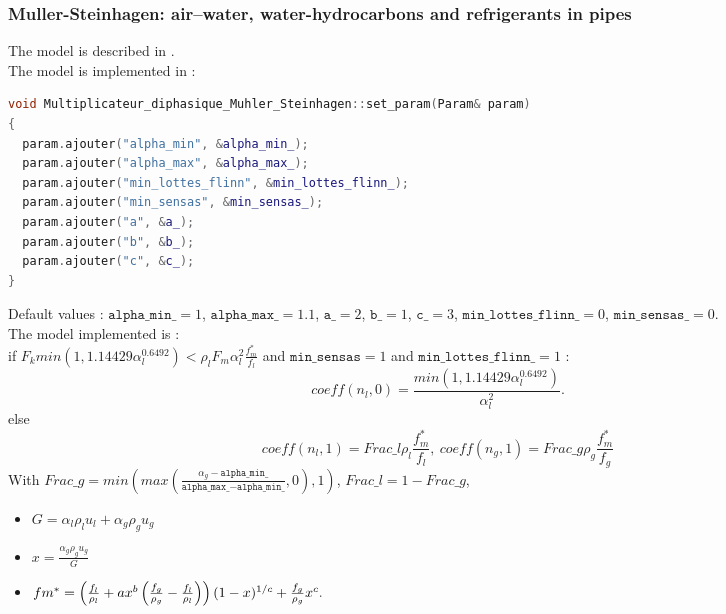 \subsubsection{Muller-Steinhagen: air–water, water-hydrocarbons and refrigerants in pipes}
The model is described in \cite{MULLERSTEINHAGEN1986297}.\\
The model is implemented in :
\begin{lstlisting}[language=c++]
void Multiplicateur_diphasique_Muhler_Steinhagen::set_param(Param& param)
{
  param.ajouter("alpha_min", &alpha_min_);
  param.ajouter("alpha_max", &alpha_max_);
  param.ajouter("min_lottes_flinn", &min_lottes_flinn_);
  param.ajouter("min_sensas", &min_sensas_);
  param.ajouter("a", &a_);
  param.ajouter("b", &b_);
  param.ajouter("c", &c_);
}
\end{lstlisting}
Default values : $\texttt{alpha\_min\_} = 1$, $\texttt{alpha\_max\_} = 1.1$, $\texttt{a\_} = 2$, $\texttt{b\_} = 1$, $\texttt{c\_} = 3$, $\texttt{min\_lottes\_flinn\_} = 0$, $\texttt{min\_sensas\_} = 0$.\\
The model implemented is :\\
if $F_k min(1,1.14429\alpha_l^{0.6492}) < \rho_l F_m \alpha_l^2 \frac{f_m^*}{f_l}$ and $\texttt{min\_sensas}=1$ and $\texttt{min\_lottes\_flinn\_}=1$ : 
\begin{equation}
    coeff(n_l, 0) = \frac{min(1,1.14429\alpha_l^{0.6492})}{\alpha_l^2}.
\end{equation}
else 
\begin{equation}
    coeff(n_l, 1) = Frac\_l\rho_l\frac{f_m^*}{f_l},\ coeff(n_g, 1) = Frac\_g\rho_g\frac{f_m^*}{f_g}
\end{equation}
With $Frac\_g=min(max(\frac{\alpha_g-\texttt{alpha\_min\_}}{\texttt{alpha\_max\_}-\texttt{alpha\_min\_}},0),1)$, $Frac\_l=1-Frac\_g$,
\begin{itemize}
    \item[\small \textcolor{blue}{\ding{109}}]$G=\alpha_l\rho_lu_l+\alpha_g\rho_gu_g$
    \item[\small \textcolor{blue}{\ding{109}}]$x=\frac{\alpha_g \rho_gu_g}{G}$
    \item[\small \textcolor{blue}{\ding{109}}]$fm^*=\left( \frac{f_l}{\rho_l}+ax^b\left( \frac{f_g}{\rho_g}-\frac{f_l}{\rho_l} \right) \right)(1-x)^{1/c}+\frac{f_g}{\rho_g}x^c.$
\end{itemize}
